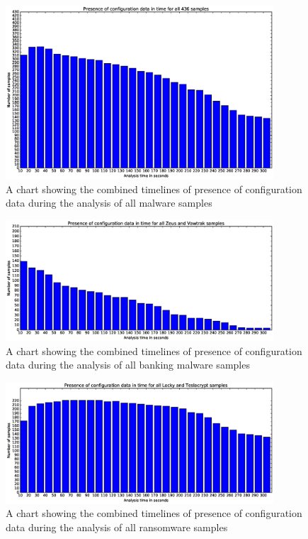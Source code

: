 \documentclass[conference]{IEEEtran}
\begin{document}
\begin{figure}[!h]
    \includegraphics[width=10cm,scale=0.5]{images/final/final-barchart.eps}
    \caption{A chart showing the combined timelines of presence of configuration data during the analysis of all malware samples}
    \label{fig:barchart-all}
\end{figure}

\begin{figure}[!h]
    \includegraphics[width=10cm,scale=0.5]{images/final/banking-barchart.eps}
    \caption{A chart showing the combined timelines of presence of configuration data during the analysis of all banking malware samples}
    \label{fig:barchart-banking}
\end{figure}

\begin{figure}[!h]
    \includegraphics[width=10cm,scale=0.5]{images/final/ransomware-barchart.eps}
    \caption{A chart showing the combined timelines of presence of configuration data during the analysis of all ransomware samples}
    \label{fig:barchart-ransom}
\end{figure}
\end{document}
